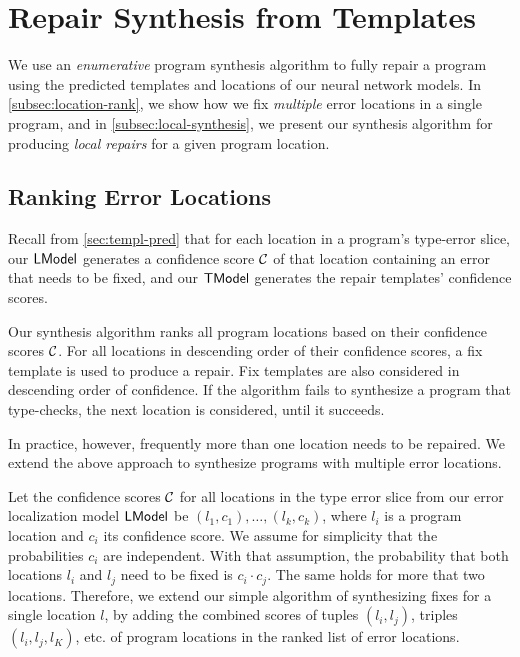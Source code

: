 \section{Repair Synthesis from Templates}
\label{sec:synthesis}
We use an \emph{enumerative} program synthesis algorithm to fully repair a
program using the predicted templates and locations of our neural network
models. In \autoref{subsec:location-rank}, we show how we fix \emph{multiple}
error locations in a single program, and in \autoref{subsec:local-synthesis}, we
present our synthesis algorithm for producing \emph{local repairs} for a given
program location.

\subsection{Ranking Error Locations}
\label{subsec:location-rank}

Recall from \autoref{sec:templ-pred} that for each location in a program's
type-error slice, our $\mathsf{LModel}$ generates a confidence score $\mathcal{C}$ of that
location containing an error that needs to be fixed, and our $\mathsf{TModel}$ generates
the repair templates' confidence scores.

Our synthesis algorithm ranks all program locations based on their confidence
scores $\mathcal{C}$. For all locations in descending order of their confidence
scores, a fix template is used to produce a repair. Fix templates are also
considered in descending order of confidence. If the algorithm fails to
synthesize a program that type-checks, the next location is considered, until it
succeeds.

In practice, however, frequently more than one location needs to be repaired. We
extend the above approach to synthesize programs with multiple error locations.

Let the confidence scores $\mathcal{C}$ for all locations in the type error slice from
our error localization model $\mathsf{LModel}$ be $(l_1, c_1), \dots, (l_k, c_k)$, where
$l_i$ is a program location and $c_i$ its confidence score. We assume for
simplicity that the probabilities $c_i$ are independent. With that assumption,
the probability that both locations $l_i$ and $l_j$ need to be fixed is $c_i
\cdot c_j$. The same holds for more that two locations. Therefore, we extend our
simple algorithm of synthesizing fixes for a single location $l$, by adding the
combined scores of tuples $(l_i, l_j)$, triples $(l_i, l_j, l_K)$, etc. of
program locations in the ranked list of error locations.



